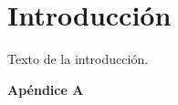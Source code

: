 \documentclass{article}
\begin{document}
	
	\section{Introducción}
	Texto de la introducción.
	
	\newpage
	\appendix
	
	\thispagestyle{empty} %
	\vspace*{\fill}
	\begin{center}
		{\LARGE \textbf{Apéndice A}}
	\end{center}
	\vspace*{\fill}
	\newpage
	
	
	
\end{document}
